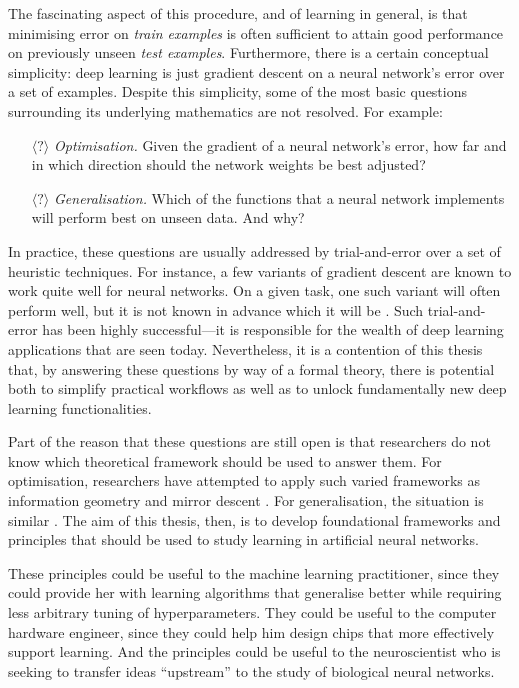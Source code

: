 \begin{refsection}
The fascinating aspect of this procedure, and of learning in general, is that minimising error on \textit{train examples} is often sufficient to attain good performance on previously unseen \textit{test examples}. Furthermore, there is a certain conceptual simplicity: deep learning is just gradient descent on a neural network's error over a set of examples. Despite this simplicity, some of the most basic questions surrounding its underlying mathematics are not resolved. For example:

\begin{enumerate}
    \item[$\langle?\rangle$] \textit{Optimisation.} Given the gradient of a neural network's error, how far and in which direction should the network weights be best adjusted?
    \item[$\langle?\rangle$] \textit{Generalisation.} Which of the functions that a neural network implements will perform best on unseen data. And why?
\end{enumerate}

In practice, these questions are usually addressed by trial-and-error over a set of heuristic techniques. For instance, a few variants of gradient descent are known to work quite well for neural networks. On a given task, one such variant will often perform well, but it is not known in advance which it will be \citep{crowded_valley}. Such trial-and-error has been highly successful---it is responsible for the wealth of deep learning applications that are seen today. Nevertheless, it is a contention of this thesis that, by answering these questions by way of a formal theory, there is potential both to simplify practical workflows as well as to unlock fundamentally new deep learning functionalities.

Part of the reason that these questions are still open is that researchers do not know which theoretical framework should be used to answer them. For optimisation, researchers have attempted to apply such varied frameworks as information geometry \citep{amari} and mirror descent \citep{azizan2018stochastic}. For generalisation, the situation is similar \citep{Prez2020GeneralizationBF}. The aim of this thesis, then, is to develop foundational frameworks and principles that should be used to study learning in artificial neural networks. 

These principles could be useful to the machine learning practitioner, since they could provide her with learning algorithms that generalise better while requiring less arbitrary tuning of hyperparameters. They could be useful to the computer hardware engineer, since they could help him design chips that more effectively support learning. And the principles could be useful to the neuroscientist who is seeking to transfer ideas ``upstream'' to the study of biological neural networks.


\end{refsection}
